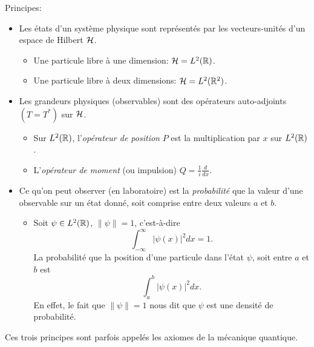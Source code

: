  Principes:
 \begin{itemize}
 \item Les états d'un système physique sont représentés par les vecteurs-unités d'un espace de Hilbert $\mathcal{H}$.
   \begin{exs}
     \begin{itemize}
     \item Une particule libre à une dimension: $\mathcal{H} = L^2(\mathbb{R})$.
       
     \item Une particule libre à deux dimensions: $\mathcal{H} = L^2(\mathbb{R}^2)$.
     \end{itemize}
   \end{exs}
   
 \item Les grandeurs physiques (\og observables\fg{}) sont des opérateurs auto-adjoints $(T = T^\ast)$ sur
   $\mathcal{H}$.
   \begin{exs}
     \begin{itemize}
     \item Sur $L^2(\mathbb{R})$, l'\emph{opérateur de position} $P$ est la
       multiplication par $x$ sur $L^2(\mathbb{R})$.
     \item L'\emph{opérateur de moment} (ou impulsion) $Q = \frac{1}{i} \frac{d}{dx}$.
     \end{itemize}
   \end{exs}
   
 \item Ce qu'on peut observer (en laboratoire) est la \emph{probabilité} que la valeur d'une observable sur un
   état donné, soit comprise entre deux valeurs $a$ et $b$.
   \begin{exs}
     \begin{itemize}
     \item Soit $\psi \in L^2(\mathbb{R})$, $\|\psi\| = 1$, c'est-à-dire 
       \[ \int_{-\infty}^\infty |\psi(x)|^2dx = 1.\]
       La probabilité que la position d'une particule dans l'état $\psi$, soit entre $a$ et $b$ est 
       \[ \int_a^b |\psi(x)|^2 dx. \]
       En effet, le fait que $\|\psi\| = 1$ nous dit que $\psi$ est une densité de probabilité.
     \end{itemize}
   \end{exs}
 \end{itemize}

 Ces trois principes sont parfois appelés les \og {}axiomes de la
 mécanique quantique\fg{}.

